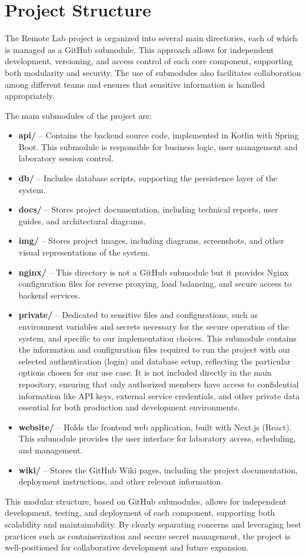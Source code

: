 \section{Project Structure}

The Remote Lab project is organized into several main directories, each of which is managed as a GitHub submodule. This approach allows for independent development, versioning, and access control of each core component, supporting both modularity and security. The use of submodules also facilitates collaboration among different teams and ensures that sensitive information is handled appropriately.

The main submodules of the project are:

\begin{itemize}
    \item \textbf{api/} -- Contains the backend source code, implemented in Kotlin with Spring Boot. This submodule is responsible for business logic, user management and laboratory session control.
    \item \textbf{db/} -- Includes database scripts, supporting the persistence layer of the system.
    \item \textbf{docs/} -- Stores project documentation, including technical reports, user guides, and architectural diagrams.
    \item \textbf{img/} -- Stores project images, including diagrams, screenshots, and other visual representations of the system.
    \item \textbf{nginx/} -- This directory is not a GitHub submodule but it provides Nginx configuration files for reverse proxying, load balancing, and secure access to backend services.
    \item \textbf{private/} -- Dedicated to sensitive files and configurations, such as environment variables and secrets necessary for the secure operation of the system, and specific to our implementation choices. This submodule contains the information and configuration files required to run the project with our selected authentication (login) and database setup, reflecting the particular options chosen for our use case. It is not included directly in the main repository, ensuring that only authorized members have access to confidential information like API keys, external service credentials, and other private data essential for both production and development environments.
    \item \textbf{website/} -- Holds the frontend web application, built with Next.js (React). This submodule provides the user interface for laboratory access, scheduling, and management.
    \item \textbf{wiki/} -- Stores the GitHub Wiki pages, including the project documentation, deployment instructions, and other relevant information.
\end{itemize}

This modular structure, based on GitHub submodules, allows for independent development, testing, and deployment of each component, supporting both scalability and maintainability. By clearly separating concerns and leveraging best practices such as containerization and secure secret management, the project is well-positioned for collaborative development and future expansion. 